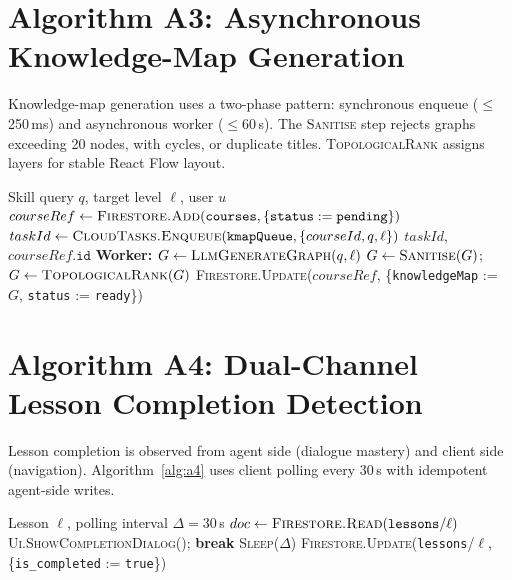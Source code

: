 \section{Algorithm A3: Asynchronous Knowledge-Map Generation}
\label{sec:algo-a3}

Knowledge-map generation uses a two-phase pattern: synchronous enqueue ($\leq$250\,ms) and asynchronous worker ($\leq$60\,s). The \textsc{Sanitise} step rejects graphs exceeding 20 nodes, with cycles, or duplicate titles. \textsc{TopologicalRank} assigns layers for stable React Flow layout.

\begin{algorithm}[H]
\caption{GenerateKnowledgeMap}
\label{alg:a3}
\begin{algorithmic}[1]
\Require Skill query $q$, target level $\ell$, user $u$
\State $courseRef \gets \textsc{Firestore.Add}(\texttt{courses}, \{\texttt{status} := \texttt{pending}\})$
\State $taskId \gets \textsc{CloudTasks.Enqueue}(\texttt{kmapQueue}, \{courseId, q, \ell\})$
\State \Return $taskId$, $courseRef.\texttt{id}$
\State \textbf{Worker:} $G \gets \textsc{LlmGenerateGraph}(q, \ell)$
\State $G \gets \textsc{Sanitise}(G)$; $G \gets \textsc{TopologicalRank}(G)$
\State \textsc{Firestore.Update}($courseRef$, \{\texttt{knowledgeMap} := $G$, \texttt{status} := \texttt{ready}\})
\end{algorithmic}
\end{algorithm}

\section{Algorithm A4: Dual-Channel Lesson Completion Detection}
\label{sec:algo-a4}

Lesson completion is observed from agent side (dialogue mastery) and client side (navigation). Algorithm~\ref{alg:a4} uses client polling every 30\,s with idempotent agent-side writes.

\begin{algorithm}[H]
\caption{DetectLessonCompletion (client polling)}
\label{alg:a4}
\begin{algorithmic}[1]
\Require Lesson $\ell$, polling interval $\Delta = 30$\,s
\Loop
    \State $doc \gets \textsc{Firestore.Read}(\texttt{lessons}/\ell)$
     \State \textsc{Ui.ShowCompletionDialog}(); \textbf{break} \EndIf
    \State \textsc{Sleep}($\Delta$)
\EndLoop
\State {} \textsc{Firestore.Update}(\texttt{lessons}/$\ell$, \{\texttt{is\_completed} := \texttt{true}\})
\end{algorithmic}
\end{algorithm}

